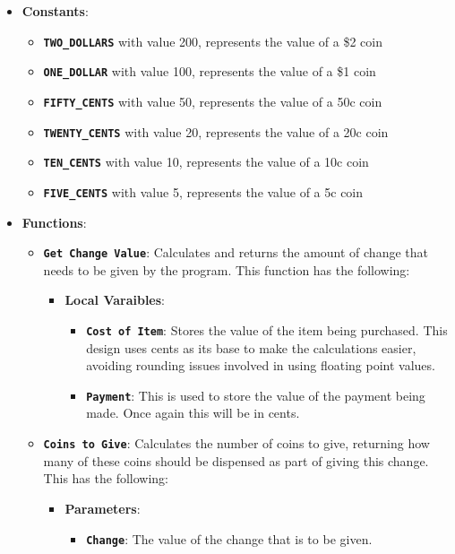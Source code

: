 \begin{itemize}
  \item \textbf{Constants}:
  \begin{itemize}
    \item \texttt{\textbf{TWO\_DOLLARS}} with value 200, represents the value of a \$2 coin
    \item \texttt{\textbf{ONE\_DOLLAR}} with value 100, represents the value of a \$1 coin
    \item \texttt{\textbf{FIFTY\_CENTS}} with value 50, represents the value of a 50c coin
    \item \texttt{\textbf{TWENTY\_CENTS}} with value 20, represents the value of a 20c coin
    \item \texttt{\textbf{TEN\_CENTS}} with value 10, represents the value of a 10c coin
    \item \texttt{\textbf{FIVE\_CENTS}} with value 5, represents the value of a 5c coin
  \end{itemize}
  \item \textbf{Functions}:
  \begin{itemize}
    \item \texttt{\textbf{Get Change Value}}: Calculates and returns the amount of change that needs to be given by the program. This function has the following:
    \begin{itemize}
      \item  \textbf{Local Varaibles}:
      \begin{itemize}
        \item \textbf{\texttt{Cost of Item}}: Stores the value of the item being purchased. This design uses cents as its base to make the calculations easier, avoiding rounding issues involved in using floating point values.
        \item \texttt{\textbf{Payment}}: This is used to store the value of the payment being made. Once again this will be in cents.
      \end{itemize}
    \end{itemize}
    \item \texttt{\textbf{Coins to Give}}: Calculates the number of coins to give, returning how many of these coins should be dispensed as part of giving this change. This has the following:
    \begin{itemize}
      \item  \textbf{Parameters}:
      \begin{itemize}
        \item \texttt{\textbf{Change}}: The value of the change that is to be given.

\end{itemize}
\end{itemize}
\end{itemize}
\end{itemize}
